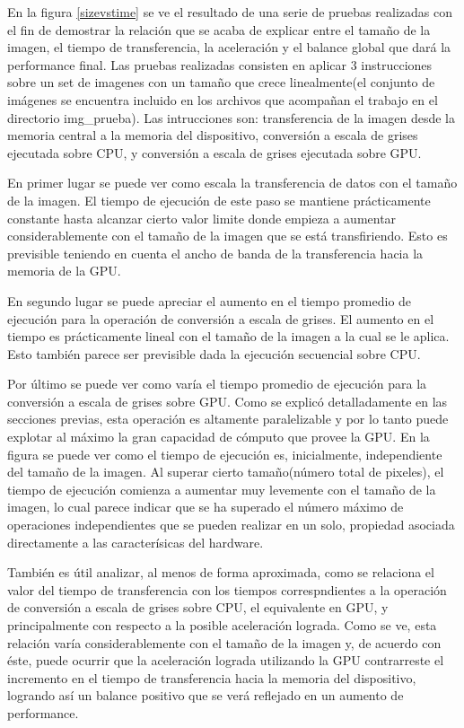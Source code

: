 \documentclass[a4paper,10pt]{report}
\begin{document}
En la figura \ref{sizevstime} se ve el resultado de una serie de pruebas realizadas con el fin de demostrar la relación que se acaba de explicar entre el tamaño de la imagen, el tiempo de transferencia, la aceleración y el balance global que dará la performance final.
Las pruebas realizadas consisten en aplicar 3 instrucciones sobre un set de imagenes con un tamaño que crece linealmente(el conjunto de imágenes se encuentra incluido en los archivos que acompañan el trabajo en el directorio img\_prueba).
Las intrucciones son: transferencia de la imagen desde la memoria central a la memoria del dispositivo, conversión a escala de grises ejecutada sobre CPU, y conversión a escala de grises ejecutada sobre GPU.

En primer lugar se puede ver como escala la transferencia de datos con el tamaño de la imagen. El tiempo de ejecución de este paso se mantiene prácticamente constante hasta alcanzar cierto valor limite donde empieza a aumentar considerablemente con el tamaño de la imagen que se está transfiriendo. 
Esto es previsible teniendo en cuenta el ancho de banda de la transferencia hacia la memoria de la GPU.

En segundo lugar se puede apreciar el aumento en el tiempo promedio de ejecución para la operación de conversión a escala de grises. El aumento en el tiempo es prácticamente lineal con el tamaño de la imagen a la cual se le aplica. 
Esto también parece ser previsible dada la ejecución secuencial sobre CPU.

Por último se puede ver como varía el tiempo promedio de ejecución para la conversión a escala de grises sobre GPU. 
Como se explicó detalladamente en las secciones previas, esta operación es altamente paralelizable y por lo tanto puede explotar al máximo la gran capacidad de cómputo que provee la GPU.
En la figura se puede ver como el tiempo de ejecución es, inicialmente, independiente del tamaño de la imagen. 
Al superar cierto tamaño(número total de pixeles), el tiempo de ejecución comienza a aumentar muy levemente con el tamaño de la imagen, lo cual parece indicar que se ha superado el número máximo de operaciones independientes que se pueden realizar en un solo, propiedad asociada directamente a las caracterísicas del hardware.

  
También es útil analizar, al menos de forma aproximada, como se relaciona el valor del tiempo de transferencia con los tiempos correspndientes a la operación de conversión a escala de grises sobre CPU, el equivalente en GPU, y principalmente con respecto a la posible aceleración lograda.
Como se ve, esta relación varía considerablemente con el tamaño de la imagen y, de acuerdo con éste, puede ocurrir que la aceleración lograda utilizando la GPU contrarreste el incremento en el tiempo de transferencia hacia la memoria del dispositivo, logrando así un balance positivo que se verá reflejado en un aumento de performance.
  
\end{document}
